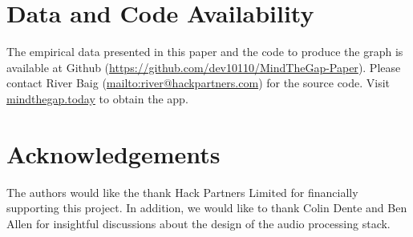 \documentclass{article}
\begin{document}
\section*{Data and Code Availability}

The empirical data presented in this paper and the code to produce the graph is available at Github (\url{https://github.com/dev10110/MindTheGap-Paper}). Please contact River Baig (\url{mailto:river@hackpartners.com}) for the source code. Visit \url{mindthegap.today} to obtain the app. 

\section*{Acknowledgements}

The authors would like the thank Hack Partners Limited for financially supporting this project. In addition, we would like to thank Colin Dente and Ben Allen for insightful discussions about the design of the audio processing stack.


  
\end{document}
